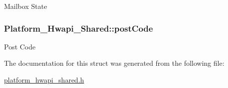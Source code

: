 Mailbox State \hypertarget{structPlatform__Hwapi__Shared_abfa2753a9aaed30223495bbb60729824}{
\subsubsection[{post\-Code}]{ Platform\-\_\-\-Hwapi\-\_\-\-Shared\-::post\-Code}}\label{structPlatform__Hwapi__Shared_abfa2753a9aaed30223495bbb60729824}
Post Code 

The documentation for this struct was generated from the following file\-:\begin{DoxyCompactItemize}
\item 
\hyperlink{platform__hwapi__shared_8h}{platform\-\_\-hwapi\-\_\-shared.\-h}\end{DoxyCompactItemize}
